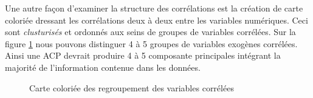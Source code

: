 	Une autre façon d'examiner la structure des corrélations est la création de carte coloriée dressant les corrélations deux à deux entre les variables numériques. Ceci sont \textit{clusturisés} et ordonnés aux seins de groupes de variables corrélées. Sur la figure \ref{fig:heatmap} nous pouvons distinguer 4 à 5 groupes de variables exogènes corrélées. Ainsi une ACP devrait produire 4 à 5 composante principales intégrant la majorité de l'information contenue dans les données.
				\begin{figure}[H]
					    		\centering
					    		\caption{Carte coloriée des regroupement des variables corrélées}
					    		\label{fig:heatmap}
				\end{figure}
